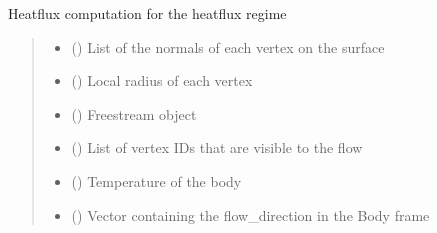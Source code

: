 \documentclass[letterpaper,10pt,english]{sphinxmanual}
\begin{document}
\begin{fulllineitems}
\label{\detokenize{modules:aerothermo.aerothermodynamics_module_bridging}}
\pysigstartsignatures
{}
\pysigstopsignatures
\sphinxAtStartPar
Heatflux computation for the heat\sphinxhyphen{}flux regime
\begin{quote}\begin{description}
\begin{itemize}
\item {} 
\sphinxAtStartPar
{} () \textendash{} List of the normals of each vertex on the surface

\item {} 
\sphinxAtStartPar
{} () \textendash{} Local radius of each vertex

\item {} 
\sphinxAtStartPar
{} () \textendash{} Freestream object

\item {} 
\sphinxAtStartPar
{} () \textendash{} List of vertex IDs that are visible to the flow

\item {} 
\sphinxAtStartPar
{} () \textendash{} Temperature of the body

\item {} 
\sphinxAtStartPar
{} () \textendash{} Vector containing the flow\_direction in the Body frame


\end{itemize}
\end{description}
\end{quote}
\end{fulllineitems}
\end{document}
